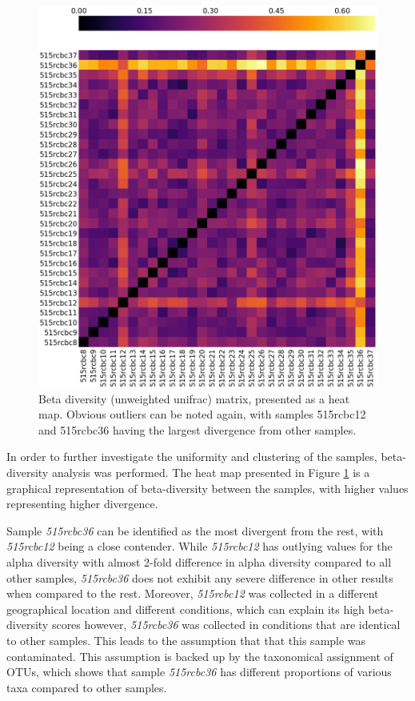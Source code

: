 \documentclass[12pt,twocolumn]{article} %
\begin{document}
\begin{figure}[ht!] %
	\includegraphics[width=\linewidth]{unweighted_beta.png}
	\caption{Beta diversity (unweighted unifrac) matrix, presented as a heat map. Obvious outliers can be noted again, with samples 515rcbc12 and 515rcbc36 having the largest divergence from other samples.}
	\label{fig:beta_diversity}
\end{figure}
\par
In order to further investigate the uniformity and clustering of the samples, beta-diversity analysis was performed. The heat map presented in Figure \ref{fig:beta_diversity} is a graphical representation of beta-diversity between the samples, with higher values representing higher divergence.
\par
Sample \textit{515rcbc36} can be identified as the most divergent from the rest, with \textit{515rcbc12} being a close contender. While \textit{515rcbc12} has outlying values for the alpha diversity with almost 2-fold difference in alpha diversity compared to all other samples, \textit{515rcbc36} does not exhibit any severe difference in other results when compared to the rest. Moreover, \textit{515rcbc12} was collected in a different geographical location and different conditions, which can explain its high beta-diversity scores however, \textit{515rcbc36} was collected in conditions that are identical to other samples. This leads to the assumption that that this sample was contaminated. This assumption is backed up by the taxonomical assignment of OTUs, which shows that sample \textit{515rcbc36} has different proportions of various taxa compared to other samples.
\end{document}
